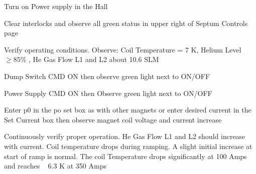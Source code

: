 {\begin{list}{.~}{\setlength{\itemsep}{-0.15cm}}
  \item Turn on Power supply in the Hall\\  
  \item Clear interlocks and observe all green status in upper
      right of Septum Controls page
  \item Verify operating conditions. Observe: Coil Temperature =
      7 K, Helium Level $\ge85\%$ , He Gas Flow L1 and L2 about 10.6 SLM
  \item Dump Switch CMD ON then observe green light next to ON/OFF
 
  \item Power Supply CMD ON then Observe green light next to ON/OFF
  \item Enter p0 in the po set box as with other magnets or enter
   desired current in the Set Current box then observe magnet coil
   voltage and current increase
  \item Continuously verify proper operation. He Gas Flow L1 and
     L2 should increase with current.  Coil temperature drops during
     ramping. A slight initial increase at start of ramp is normal.  The
     coil Temperature drops significantly at 100 Amps and reaches ~ 6.3 K
     at 350 Amps
\end{list}
 
 
} %

